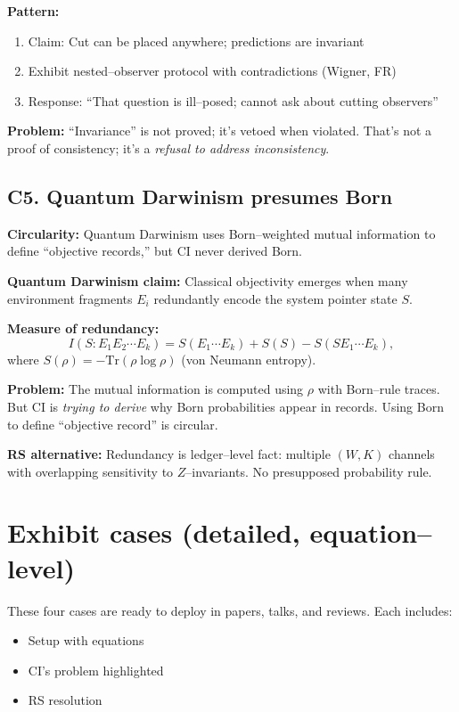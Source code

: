 \documentclass[11pt]{article}
\begin{document}
\textbf{Pattern:}
\begin{enumerate}[nosep]
  \item Claim: Cut can be placed anywhere; predictions are invariant
  \item Exhibit nested--observer protocol with contradictions (Wigner, FR)
  \item Response: ``That question is ill--posed; cannot ask about cutting observers''
\end{enumerate}

\textbf{Problem:} ``Invariance'' is not proved; it's vetoed when violated. That's not a proof of consistency; it's a \emph{refusal to address inconsistency}.

\subsection{C5. Quantum Darwinism presumes Born}

\begin{warnbox}
\textbf{Circularity:} Quantum Darwinism uses Born--weighted mutual information to define ``objective records,'' but CI never derived Born.
\end{warnbox}

\textbf{Quantum Darwinism claim:} Classical objectivity emerges when many environment fragments $E_i$ redundantly encode the system pointer state $S$.

\textbf{Measure of redundancy:}
\begin{equation}
  I(S:E_1E_2\cdots E_k) = S(E_1\cdots E_k) + S(S) - S(SE_1\cdots E_k),
\end{equation}
where $S(\rho)=-\text{Tr}(\rho\log\rho)$ (von Neumann entropy).

\textbf{Problem:} The mutual information is computed using $\rho$ with Born--rule traces. But CI is \emph{trying to derive} why Born probabilities appear in records. Using Born to define ``objective record'' is circular.

\textbf{RS alternative:} Redundancy is ledger--level fact: multiple $(W,K)$ channels with overlapping sensitivity to $Z$--invariants. No presupposed probability rule.

\section{Exhibit cases (detailed, equation--level)}

These four cases are ready to deploy in papers, talks, and reviews. Each includes:
\begin{itemize}[nosep]
  \item Setup with equations
  \item CI's problem highlighted
  \item RS resolution
\end{itemize}
\end{document}
